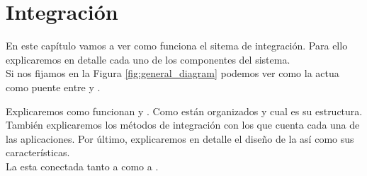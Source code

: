 









\chapter{Integración}

En este capítulo vamos a ver como funciona el sitema de integración. Para ello explicaremos en detalle cada uno de los componentes del sistema.\\

Si nos fijamos en la Figura \ref{fig:general_diagram} podemos ver como la \iface{} actua como puente entre \hs{} y \wday{}. 



Explicaremos como funcionan \hs{} y \wday{}. Como están organizados y cual es su estructura. También explicaremos los métodos de integración con los que cuenta cada una de las aplicaciones.
Por último, explicaremos en detalle el diseño de la \iface{} así como sus características.\\

La \iface{} esta conectada tanto a \hs{} como a \wday. 

